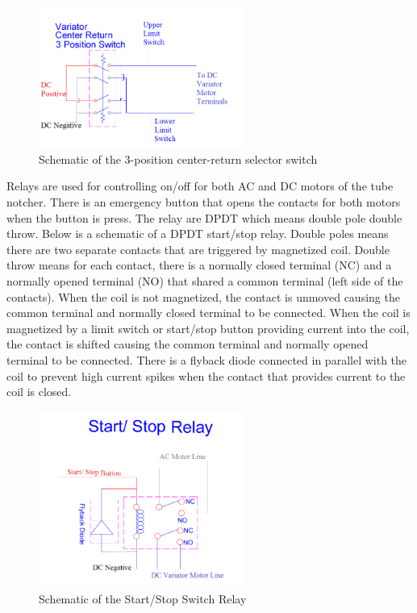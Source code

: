 \begin{figure}[H]
    \centering
    \includegraphics[width=0.6\textwidth]{./images/Chapter2-MachineDescription/3PSwitch}
    \caption{Schematic of the 3-position center-return selector switch}
    \label{fig:Electrical:3PSwitch}
\end{figure} 

Relays are used for controlling on/off for both AC and DC motors of the tube notcher. There is an emergency button that opens the contacts for both motors when the button is press. The relay are DPDT which means double pole double throw. Below is a schematic of a DPDT start/stop relay. Double poles means there are two separate contacts that are triggered by magnetized coil. Double throw means for each contact, there is a normally closed terminal (NC) and a normally opened terminal (NO) that shared a common terminal (left side of the contacts). When the coil is not magnetized, the contact is unmoved causing the common terminal and normally closed terminal to be connected. When the coil is magnetized by a limit switch or start/stop button providing current into the coil, the contact is shifted causing the common terminal and normally opened terminal to be connected. There is a flyback diode connected in parallel with the coil to prevent high current spikes when the contact that provides current to the coil is closed.
\begin{figure}[H]
    \centering
    \includegraphics[width=0.6\textwidth]{./images/Chapter2-MachineDescription/RelayPic}
    \caption{Schematic of the Start/Stop Switch Relay}
    \label{fig:Electrical:StartStopSwitchRelay}
\end{figure} 

